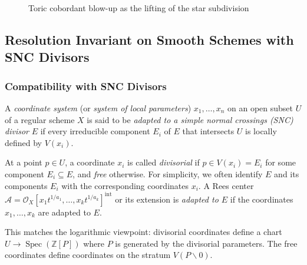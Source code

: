 \documentclass{amsart}
\newcommand{\ZZ}{{\mathbb{Z}}}
\newcommand{\cA}{{\mathcal A}}
\newcommand{\cO}{{\mathcal O}}
\newcommand{\Spec}{\operatorname{Spec}}
\renewcommand{\setminus}{\smallsetminus}
\newcommand{\inte}{{\operatorname{int}}}
\begin{document}
\begin{figure}[ht]
\caption{Toric cobordant blow-up as the lifting of the star subdivision} \label{F2}
\end{figure}

\subsection{Resolution Invariant on Smooth Schemes with SNC Divisors}


\subsubsection{Compatibility with SNC Divisors}
\begin{definition}\label{compa}
A \emph{coordinate system} (or \emph{system of local parameters}) \( x_1, \ldots, x_n \) on an open subset \( U \) of a regular scheme \( X \) is said to be \emph{adapted to a simple normal crossings (SNC) divisor} \( E \) if every irreducible component \( E_i \) of \( E \) that intersects \( U \) is locally defined by \( V(x_i) \). 

At a point \( p \in U \), a coordinate \( x_i \) is called \emph{divisorial} if \( p \in V(x_i) = E_i \) for some component \( E_i \subseteq E \), and \emph{free} otherwise. For simplicity, we often identify \( E \) and its components \( E_i \) with the corresponding coordinates \( x_i \). A Rees center \( \cA = \cO_X[x_1t^{1/a_1}, \ldots, x_kt^{1/a_k}]^\inte \) or its extension is \emph{ adapted  to $E$} if the coordinates $x_1, \ldots, x_k$ are  adapted  to $E$.
\end{definition}

\begin{remark}
This matches the logarithmic viewpoint:  divisorial  coordinates define a chart $U \to \Spec(\ZZ[P])$ where $P$ is generated by the divisorial parameters. The free coordinates define coordinates on the stratum $V(P \setminus 0)$.
\end{remark}
\end{document}
